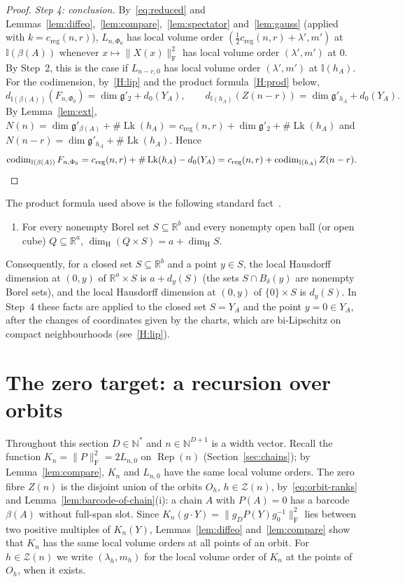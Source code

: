 \documentclass[11pt,a4paper]{article}
\theoremstyle{definition}
\theoremstyle{remark}
\numberwithin{equation}{section}
\newcommand{\N}{\mathbb{N}}
\newcommand{\R}{\mathbb{R}}
\newcommand{\Rep}{\operatorname{Rep}}
\newcommand{\codim}{\operatorname{codim}}
\newcommand{\dimH}{\dim_{\mathrm{H}}}
\newcommand{\Fr}[1]{\lVert #1\rVert_{\mathrm F}}
\newcommand{\creg}{c_{\mathrm{reg}}}
\newcommand{\Zb}{\mathcal Z}
\newcommand{\I}{\mathbb I}
\newcommand{\g}{\mathfrak g}
\newcommand{\Lk}{\operatorname{Lk}}
\begin{document}
\begin{proof}
\emph{Step 4: conclusion.} By~\eqref{eq:reduced} and Lemmas~\ref{lem:diffeo},~\ref{lem:compare},~\ref{lem:spectator} and~\ref{lem:gauss} (applied with $k=\creg(n,r)$), $L_{n,\Phi_0}$ has local volume order $(\frac{1}{2}\creg(n,r)+\lambda',m')$ at $\I(\beta(A))$ whenever $x\mapsto\Fr{X(x)}^2$ has local volume order $(\lambda',m')$ at $0$. By Step~2, this is the case if $L_{n-r,0}$ has local volume order $(\lambda',m')$ at $\I(h_A)$. For the codimension, by~\ref{H:lip} and the product formula~\ref{H:prod} below,
\[
d_{\I(\beta(A))}(F_{n,\Phi_0})=\dim\g'_2+d_0(Y_A),\qquad d_{\I(h_A)}(Z(n-r))=\dim\g'_{h_A}+d_0(Y_A).
\]
By Lemma~\ref{lem:ext}, $N(n)=\dim\g'_{\beta(A)}+\#\Lk(h_A)=\creg(n,r)+\dim\g'_2+\#\Lk(h_A)$ and $N(n-r)=\dim\g'_{h_A}+\#\Lk(h_A)$. Hence
\[
\codim_{\I(\beta(A))}F_{n,\Phi_0}=\creg(n,r)+\#\Lk(h_A)-d_0(Y_A)=\creg(n,r)+\codim_{\I(h_A)}Z(n-r).\qedhere
\]
\end{proof}

The product formula used above is the following standard fact~\cite[Product formulae~7.2 and~7.3]{falconer}.
\begin{enumerate}[label=(H\arabic*),leftmargin=3em,start=4]
\item\label{H:prod} For every nonempty Borel set $S\subseteq\R^b$ and every nonempty open ball (or open cube) $Q\subseteq\R^a$, $\dimH(Q\times S)=a+\dimH S$.
\end{enumerate}
Consequently, for a closed set $S\subseteq\R^b$ and a point $y\in S$, the local Hausdorff dimension at $(0,y)$ of $\R^a\times S$ is $a+d_y(S)$ (the sets $S\cap B_\delta(y)$ are nonempty Borel sets), and the local Hausdorff dimension at $(0,y)$ of $\{0\}\times S$ is $d_y(S)$. In Step~4 these facts are applied to the closed set $S=Y_A$ and the point $y=0\in Y_A$, after the changes of coordinates given by the charts, which are bi-Lipschitz on compact neighbourhoods (see~\ref{H:lip}).
\section{The zero target: a recursion over orbits}\label{sec:zero}

Throughout this section $D\in\N^*$ and $n\in\N^{D+1}$ is a width vector. Recall the function $K_n=\Fr P^2=2L_{n,0}$ on $\Rep(n)$ (Section~\ref{sec:chains}); by Lemma~\ref{lem:compare}, $K_n$ and $L_{n,0}$ have the same local volume orders. The zero fibre $Z(n)$ is the disjoint union of the orbits $O_h$, $h\in\Zb(n)$, by~\eqref{eq:orbit-ranks} and Lemma~\ref{lem:barcode-of-chain}(i): a chain $A$ with $P(A)=0$ has a barcode $\beta(A)$ without full-span slot. Since $K_n(g\cdot Y)=\Fr{g_DP(Y)g_0^{-1}}^2$ lies between two positive multiples of $K_n(Y)$, Lemmas~\ref{lem:diffeo} and~\ref{lem:compare} show that $K_n$ has the same local volume orders at all points of an orbit. For $h\in\Zb(n)$ we write $(\lambda_h,m_h)$ for the local volume order of $K_n$ at the points of $O_h$, when it exists.
\end{document}
